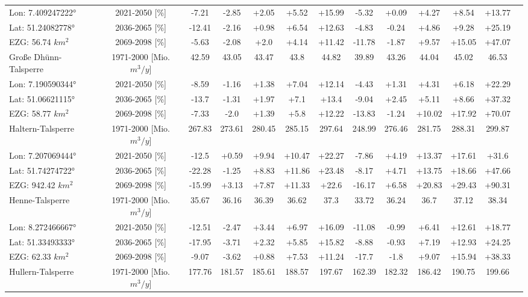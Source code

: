 \begin{longtable}{@{\extracolsep{\fill}}lc|ccccc||cccccc}
\cline{2-12} 
Lon: 7.409247222° & 2021-2050 [\%]  & -7.21 & -2.85 & +2.05 & +5.52 & +15.99 & -5.32 & +0.09 & +4.27 & +8.54 & +13.77\\ 
Lat: 51.24082778° & 2036-2065 [\%]  & -12.41 & -2.16 & +0.98 & +6.54 & +12.63 & -4.83 & -0.24 & +4.86 & +9.28 & +25.19\\ 
EZG: 56.74 $km^2$ & 2069-2098 [\%]  & -5.63 & -2.08 & +2.0 & +4.14 & +11.42 & -11.78 & -1.87 & +9.57 & +15.05 & +47.07\\ 
\hline 
Große Dhünn-Talsperre & 1971-2000 [Mio. $m^3/y$]  & 42.59 & 43.05 & 43.47 & 43.8 & 44.82 & 39.89 & 43.26 & 44.04 & 45.02 & 46.53\\ 
\cline{2-12} 
Lon: 7.190590344° & 2021-2050 [\%]  & -8.59 & -1.16 & +1.38 & +7.04 & +12.14 & -4.43 & +1.31 & +4.31 & +6.18 & +22.29\\ 
Lat: 51.06621115° & 2036-2065 [\%]  & -13.7 & -1.31 & +1.97 & +7.1 & +13.4 & -9.04 & +2.45 & +5.11 & +8.66 & +37.32\\ 
EZG: 58.77 $km^2$ & 2069-2098 [\%]  & -7.33 & -2.0 & +1.39 & +5.8 & +12.22 & -13.83 & -1.24 & +10.02 & +17.92 & +70.07\\ 
\hline 
Haltern-Talsperre & 1971-2000 [Mio. $m^3/y$]  & 267.83 & 273.61 & 280.45 & 285.15 & 297.64 & 248.99 & 276.46 & 281.75 & 288.31 & 299.87\\ 
\cline{2-12} 
Lon: 7.207069444° & 2021-2050 [\%]  & -12.5 & +0.59 & +9.94 & +10.47 & +22.27 & -7.86 & +4.19 & +13.37 & +17.61 & +31.6\\ 
Lat: 51.74274722° & 2036-2065 [\%]  & -22.28 & -1.25 & +8.83 & +11.86 & +23.48 & -8.17 & +4.71 & +13.75 & +18.66 & +47.66\\ 
EZG: 942.42 $km^2$ & 2069-2098 [\%]  & -15.99 & +3.13 & +7.87 & +11.33 & +22.6 & -16.17 & +6.58 & +20.83 & +29.43 & +90.31\\ 
\hline 
Henne-Talsperre & 1971-2000 [Mio. $m^3/y$]  & 35.67 & 36.16 & 36.39 & 36.62 & 37.3 & 33.72 & 36.24 & 36.7 & 37.12 & 38.34\\ 
\cline{2-12} 
Lon: 8.272466667° & 2021-2050 [\%]  & -12.51 & -2.47 & +3.44 & +6.97 & +16.09 & -11.08 & -0.99 & +6.41 & +12.61 & +18.77\\ 
Lat: 51.33493333° & 2036-2065 [\%]  & -17.95 & -3.71 & +2.32 & +5.85 & +15.82 & -8.88 & -0.93 & +7.19 & +12.93 & +24.25\\ 
EZG: 62.33 $km^2$ & 2069-2098 [\%]  & -9.07 & -3.62 & +0.88 & +7.53 & +11.24 & -17.7 & -1.8 & +9.07 & +15.94 & +38.33\\ 
\hline 
Hullern-Talsperre & 1971-2000 [Mio. $m^3/y$]  & 177.76 & 181.57 & 185.61 & 188.57 & 197.67 & 162.39 & 182.32 & 186.42 & 190.75 & 199.66\\ 

\end{longtable}
